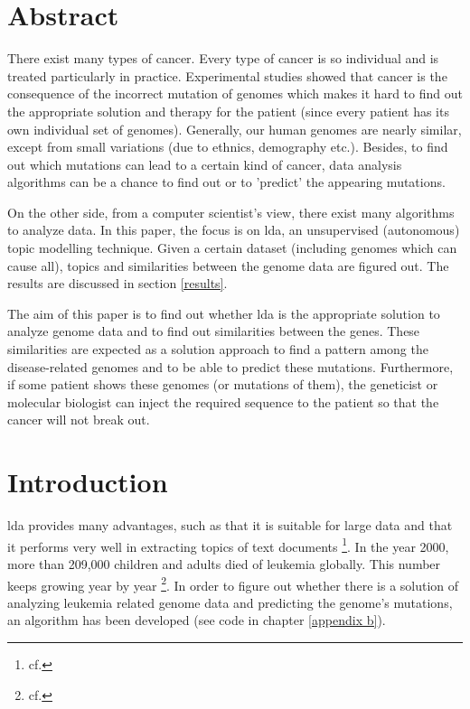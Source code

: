 




\chapter{Abstract}\label{abstract}

There exist many types of cancer. Every type of cancer is so individual and is treated particularly in practice. Experimental studies showed that cancer is the consequence of the incorrect mutation of genomes which makes it hard to find out the appropriate solution and therapy for the patient (since every patient has its own individual set of genomes). Generally, our human genomes are nearly similar, except from small variations (due to ethnics, demography etc.). Besides, to find out which mutations can lead to a certain kind of cancer, data analysis algorithms can be a chance to find out or to 'predict' the appearing mutations.

On the other side, from a computer scientist's view, there exist many algorithms to analyze data. In this paper, the focus is on \ac{lda}, an unsupervised (autonomous) topic modelling technique. Given a certain dataset (including genomes which can cause \ac{all}), topics and similarities between the genome data are figured out. The results are discussed in section \ref{results}.

The aim of this paper is to find out whether \ac{lda} is the appropriate solution to analyze genome data and to find out similarities between the genes. These similarities are expected as a solution approach to find a pattern among the disease-related genomes and to be able to predict these mutations. Furthermore, if some patient shows these genomes (or mutations of them), the geneticist or molecular biologist can inject the required sequence to the patient so that the cancer will not break out.

\chapter{Introduction}\label{introduction}

\ac{lda} provides many advantages, such as that it is suitable for large data and that it performs very well in extracting topics of text documents \footnote{cf.\autocite{twinandilla_2018}}.
In the year 2000, more than 209,000 children and adults died of leukemia globally. This number keeps growing year by year \footnote{cf.\autocite{tang}}.
In order to figure out whether there is a solution of analyzing leukemia related genome data and predicting the genome's mutations, an algorithm has been developed (see code in chapter \ref{appendix b}).

